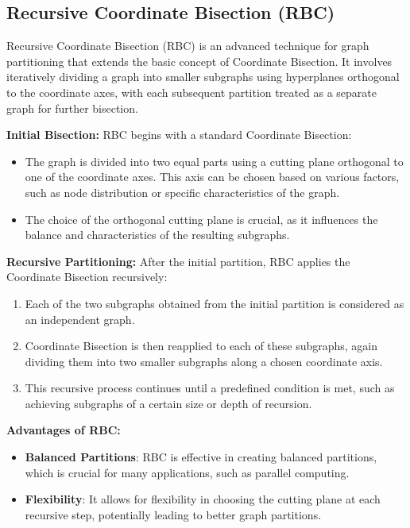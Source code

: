 \documentclass[unicode,11pt,a4paper,oneside,numbers=endperiod,openany]{scrartcl}
\begin{document}
\subsection{Recursive Coordinate Bisection (RBC)}

Recursive Coordinate Bisection (RBC) is an advanced technique for graph partitioning that extends the basic concept of Coordinate Bisection. It involves iteratively dividing a graph into smaller subgraphs using hyperplanes orthogonal to the coordinate axes, with each subsequent partition treated as a separate graph for further bisection.

\textbf{Initial Bisection:}
RBC begins with a standard Coordinate Bisection:
\begin{itemize}
    \item The graph is divided into two equal parts using a cutting plane orthogonal to one of the coordinate axes. This axis can be chosen based on various factors, such as node distribution or specific characteristics of the graph.
    \item The choice of the orthogonal cutting plane is crucial, as it influences the balance and characteristics of the resulting subgraphs.
\end{itemize}

\textbf{Recursive Partitioning:}
After the initial partition, RBC applies the Coordinate Bisection recursively:
\begin{enumerate}
    \item Each of the two subgraphs obtained from the initial partition is considered as an independent graph.
    \item Coordinate Bisection is then reapplied to each of these subgraphs, again dividing them into two smaller subgraphs along a chosen coordinate axis.
    \item This recursive process continues until a predefined condition is met, such as achieving subgraphs of a certain size or depth of recursion.
\end{enumerate}

\textbf{Advantages of RBC:}
\begin{itemize}
    \item \textbf{Balanced Partitions}: RBC is effective in creating balanced partitions, which is crucial for many applications, such as parallel computing.
    \item \textbf{Flexibility}: It allows for flexibility in choosing the cutting plane at each recursive step, potentially leading to better graph partitions.
\end{itemize}
\end{document}
